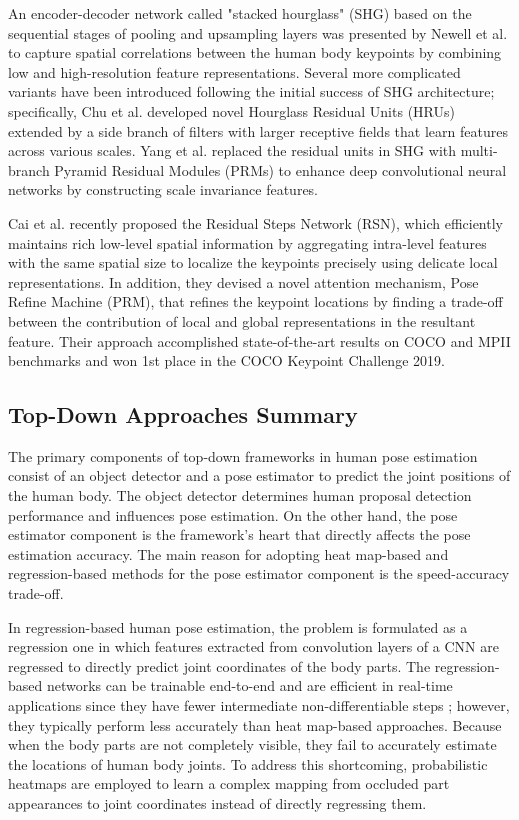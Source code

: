 An encoder-decoder network called "stacked hourglass" (SHG) based on the sequential stages of pooling and upsampling layers was presented by Newell et al. \cite{newell_stacked_2016} to capture spatial correlations between the human body keypoints by combining low and high-resolution feature representations. Several more complicated variants have been introduced following the initial success of SHG architecture; specifically, Chu et al. \cite{chu_multi-context_2017} developed novel Hourglass Residual Units (HRUs) extended by a side branch of filters with larger receptive fields that learn features across various scales. Yang et al. \cite{yang_learning_2017} replaced the residual units in SHG with multi-branch Pyramid Residual Modules (PRMs) to enhance deep convolutional neural networks by constructing scale invariance features. 

Cai et al. \cite{cai_learning_2020} recently proposed the Residual Steps Network (RSN), which efficiently maintains rich low-level spatial information by aggregating intra-level features with the same spatial size to localize the keypoints precisely using delicate local representations. In addition, they devised a novel attention mechanism, Pose Refine Machine (PRM), that refines the keypoint locations by finding a trade-off between the contribution of local and global representations in the resultant feature. Their approach accomplished state-of-the-art results on COCO and MPII benchmarks and won 1st place in the COCO Keypoint Challenge 2019.


\subsection*{Top-Down Approaches Summary}

The primary components of top-down frameworks in human pose estimation consist of an object detector and a pose estimator to predict the joint positions of the human body. The object detector determines human proposal detection performance and influences pose estimation. On the other hand, the pose estimator component is the framework's heart that directly affects the pose estimation accuracy. The main reason for adopting heat map-based and regression-based methods for the pose estimator component is the speed-accuracy trade-off. 

In regression-based human pose estimation, the problem is formulated as a regression one in which features extracted from convolution layers of a CNN are regressed to directly predict joint coordinates of the body parts. The regression-based networks can be trainable end-to-end and are efficient in real-time applications since they have fewer intermediate non-differentiable steps \cite{liu_cascaded_2018, eichner_human_2012, felzenszwalb_pictorial_2005, girdhar_detect-and-track_2018}; however, they typically perform less accurately than heat map-based approaches. Because when the body parts are not completely visible, they fail to accurately estimate the locations of human body joints. To address this shortcoming, probabilistic heatmaps are employed to learn a complex mapping from occluded part appearances to joint coordinates instead of directly regressing them. 

